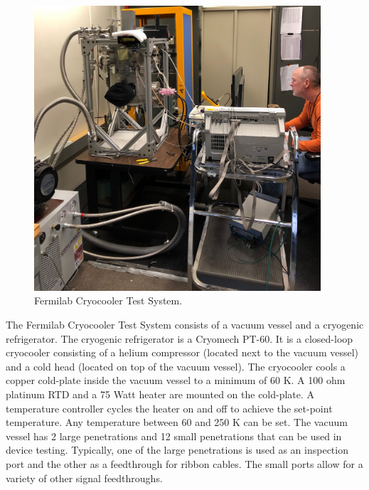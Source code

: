 \label{sec:2.3}
\begin{figure}[htb]
\centering
\begin{center}
\includegraphics[width=0.95\textwidth]{figures/cryotestsystem.jpg}
\end{center}
\caption{Fermilab Cryocooler Test System.}
\label{fig:cryocoolertestsystem}
\end{figure}

The Fermilab Cryocooler Test System consists of a vacuum vessel and a cryogenic refrigerator. The cryogenic refrigerator is a Cryomech PT-60.  It is a closed-loop cryocooler consisting of a helium compressor (located next to the vacuum vessel) and a cold head (located on top of the vacuum vessel).  The cryocooler cools a copper cold-plate inside the vacuum vessel to a minimum of 60 K.  A 100 ohm platinum RTD and a 75 Watt heater are mounted on the cold-plate.  A temperature controller cycles the heater on and off to achieve the set-point temperature.  Any temperature between 60 and 250 K can be set.
The vacuum vessel has 2 large penetrations and 12 small penetrations that can be used in device testing.  Typically, one of the large penetrations is used as an inspection port and the other as a feedthrough for ribbon cables.  The small ports allow for a variety of other signal feedthroughs.  

